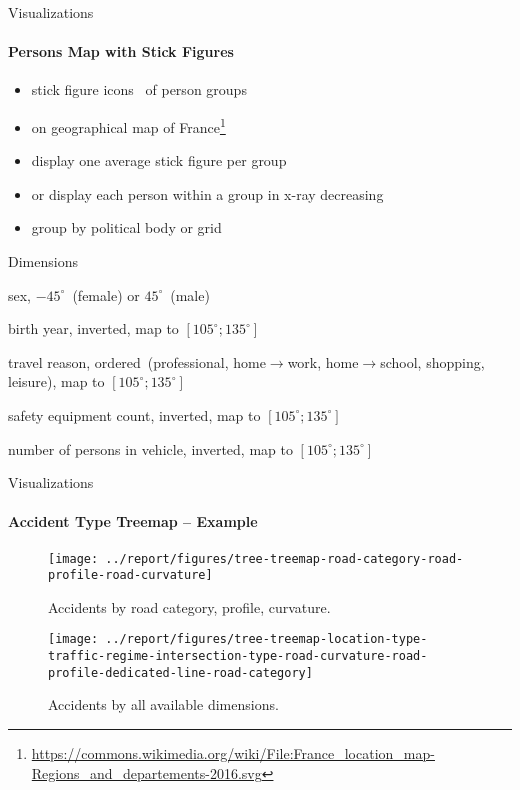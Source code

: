 \documentclass[english]{mlutalk}
\begin{document}
\begin{frame}{Visualizations}
  \framesubtitle{Persons Map with Stick Figures}
  \begin{itemize}
    \item stick figure icons~\cite{PickettG1988} of person groups
    \item on geographical map of France\footnote{\tiny\url{https://commons.wikimedia.org/wiki/File:France_location_map-Regions_and_departements-2016.svg}}
    \item display one average stick figure per group
    \item or display each person within a group in x-ray decreasing
    \item group by political body or grid
  \end{itemize}

  \begin{block}{Dimensions}
    \scriptsize
    \begin{description}
      \setlength{\itemsep}{1pt}
      \item[\(\alpha\)] sex, \(-45^\circ\)~(female) or \(45^\circ\)~(male)
      \item[\(\beta\)] birth year, inverted, map to  \([105^\circ; 135^\circ]\)
      \item[\(\gamma\)] travel reason, ordered~(professional, home\(\to\)work, home\(\to\)school, shopping, leisure), map to  \([105^\circ; 135^\circ]\)
      \item[\(\delta\)] safety equipment count, inverted, map to  \([105^\circ; 135^\circ]\)
      \item[\(\epsilon\)] number of persons in vehicle, inverted, map to  \([105^\circ; 135^\circ]\)
    \end{description}
  \end{block}
\end{frame}

\begin{frame}{Visualizations}
  \framesubtitle{Accident Type Treemap -- Example}
  \begin{minipage}{0.49\linewidth}
    \begin{figure}
      \centering
      \texttt{[image: ../report/figures/tree-treemap-road-category-road-profile-road-curvature]}
      \caption{Accidents by road category, profile, curvature.}
    \end{figure}
  \end{minipage}
  \begin{minipage}{0.49\linewidth}
    \begin{figure}
      \centering
      \texttt{[image: ../report/figures/tree-treemap-location-type-traffic-regime-intersection-type-road-curvature-road-profile-dedicated-line-road-category]}
      \caption{Accidents by all available dimensions.}
    \end{figure}
  \end{minipage}
\end{frame}
\end{document}
